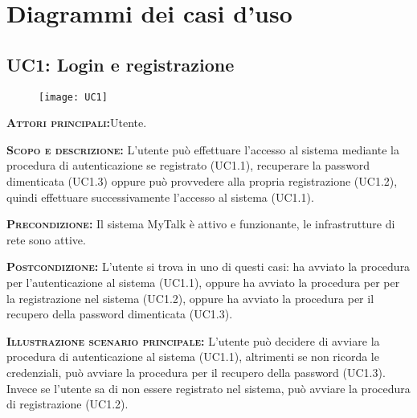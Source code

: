 \newpage\section{Diagrammi dei casi d'uso}

\subsection{UC1: Login e registrazione}
\begin{figure}[H]
\begin{center}
\texttt{[image: UC1]}
\caption{}\label{fig:}
\end{center}
\end{figure}
\begin{description}
\item{\scshape\bfseries Attori principali:}Utente.
\item{\scshape\bfseries Scopo e descrizione:} L'utente può effettuare l'accesso al sistema mediante la procedura di autenticazione se registrato (UC1.1), recuperare la password dimenticata (UC1.3) oppure può provvedere alla propria registrazione (UC1.2), quindi effettuare successivamente l'accesso al sistema (UC1.1).
\item{\scshape\bfseries Precondizione:} Il sistema MyTalk è attivo e funzionante, le infrastrutture di rete sono attive.
\item{\scshape\bfseries Postcondizione:} L'utente si trova in uno di questi casi: ha avviato la procedura per l'autenticazione al sistema (UC1.1), oppure ha avviato la procedura per per la registrazione nel sistema (UC1.2), oppure ha avviato la procedura per il recupero della password dimenticata (UC1.3).
\item{\scshape\bfseries Illustrazione scenario principale:} L'utente può decidere di avviare la procedura di autenticazione al sistema (UC1.1), altrimenti se non ricorda le credenziali, può avviare la procedura per il recupero della password (UC1.3). Invece se l'utente sa di non essere registrato nel sistema, può avviare la procedura di registrazione (UC1.2).
\end{description}

